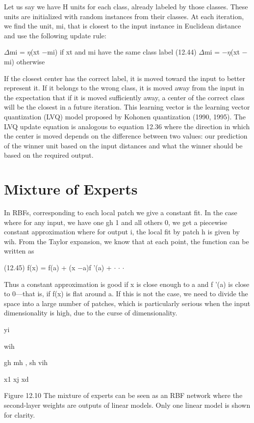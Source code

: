 Let us say we have H units for each class, already labeled by those classes. These units are initialized with random instances from their classes. At each iteration, we find the unit, mi, that is closest to the input instance in Euclidean distance and use the following update rule:

$\Delta$mi = $\eta$(xt $-$mi) if xt and mi have the same class label (12.44) $\Delta$mi = $-$$\eta$(xt $-$mi) otherwise

If the closest center has the correct label, it is moved toward the input to better represent it. If it belongs to the wrong class, it is moved away from the input in the expectation that if it is moved sufficiently away, a center of the correct class will be the closest in a future iteration. This learning vector is the learning vector quantization (LVQ) model proposed by Kohonen quantization (1990, 1995). The LVQ update equation is analogous to equation 12.36 where the direction in which the center is moved depends on the difference between two values: our prediction of the winner unit based on the input distances and what the winner should be based on the required output.

\section{Mixture of Experts}

In RBFs, corresponding to each local patch we give a constant fit. In the case where for any input, we have one gh 1 and all others 0, we get a piecewise constant approximation where for output i, the local fit by patch h is given by wih. From the Taylor expansion, we know that at each point, the function can be written as

(12.45) f(x) = f(a) + (x $-$a)f '(a) + $\cdot$ $\cdot$ $\cdot$

Thus a constant approximation is good if x is close enough to a and f '(a) is close to 0---that is, if f(x) is flat around a. If this is not the case, we need to divide the space into a large number of patches, which is particularly serious when the input dimensionality is high, due to the curse of dimensionality.

yi

wih

gh mh , sh vih

x1 xj xd

Figure 12.10 The mixture of experts can be seen as an RBF network where the second-layer weights are outputs of linear models. Only one linear model is shown for clarity.

